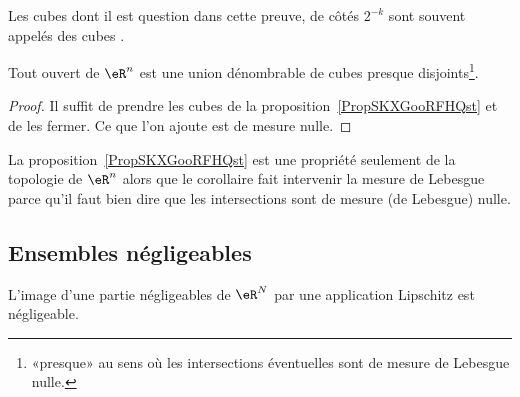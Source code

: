 Les cubes dont il est question dans cette preuve, de côtés \( 2^{-k}\) sont souvent appelés des cubes .

\begin{corollary}     \label{CorTHDQooWMSbJe}
    Tout ouvert de \( \eR^n\) est une union dénombrable de cubes presque disjoints\footnote{«presque» au sens où les intersections éventuelles sont de mesure de Lebesgue nulle.}.
\end{corollary}

\begin{proof}
    Il suffit de prendre les cubes de la proposition~\ref{PropSKXGooRFHQst} et de les fermer. Ce que l'on ajoute est de mesure nulle.
\end{proof}

\begin{remark}
    La proposition~\ref{PropSKXGooRFHQst} est une propriété seulement de la topologie de \( \eR^n\) alors que le corollaire fait intervenir la mesure de Lebesgue parce qu'il faut bien dire que les intersections sont de mesure (de Lebesgue) nulle.
\end{remark}

\subsection{Ensembles négligeables}

\begin{lemma}      \label{LemWHKJooGPuxEN}
    L'image d'une partie négligeables de \( \eR^N\) par une application Lipschitz est négligeable.
\end{lemma}

